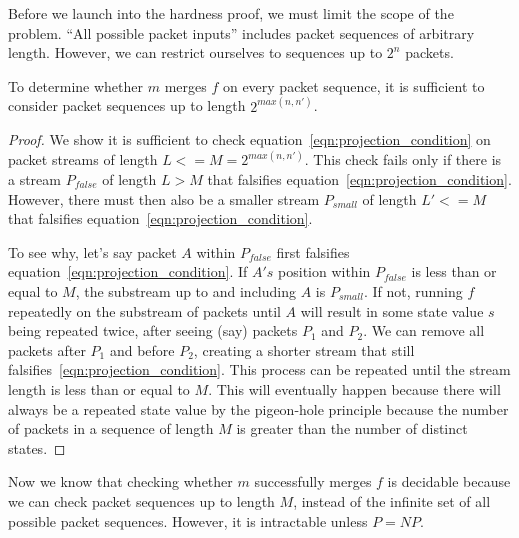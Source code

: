 Before we launch into the hardness proof, we must limit the scope of the problem. ``All possible packet inputs'' includes
packet sequences of arbitrary length. However, we can restrict ourselves to sequences up to $2^n$ packets.

\begin{theorem}
To determine whether $m$ merges $f$ on every packet sequence, it is sufficient
to consider packet sequences up to length $2^{max(n, n')}$.
\end{theorem}
\begin{proof}
We show it is sufficient to check equation~\ref{eqn:projection_condition} on
packet streams of length $L <= M = 2^{max(n, n')}$. This check fails only if
there is a stream $P_{false}$ of length $L > M$ that falsifies
equation~\ref{eqn:projection_condition}. However, there must then also be a
smaller stream $P_{small}$ of length $L'<=M$ that falsifies
equation~\ref{eqn:projection_condition}.

To see why, let's say packet $A$ within $P_{false}$ first falsifies
equation~\ref{eqn:projection_condition}. If $A's$ position within $P_{false}$
is less than or equal to $M$, the substream up to and including $A$ is
$P_{small}$. If not, running $f$ repeatedly on the substream of packets until
$A$ will result in some state value $s$ being repeated twice, after seeing
(say) packets $P_{1}$ and $P_{2}$. We can remove all packets after $P_{1}$ and
before $P_{2}$, creating a shorter stream that still
falsifies~\ref{eqn:projection_condition}.  This process can be repeated until
the stream length is less than or equal to $M$. This will eventually happen
because there will always be a repeated state value by the pigeon-hole
principle because the number of packets in a sequence of length $M$ is greater
than the number of distinct states.
\end{proof}

Now we know that checking whether $m$ successfully merges $f$ is decidable
because we can check packet sequences up to length $M$, instead of the infinite
set of all possible packet sequences.  However, it is intractable unless
$P=NP$.

